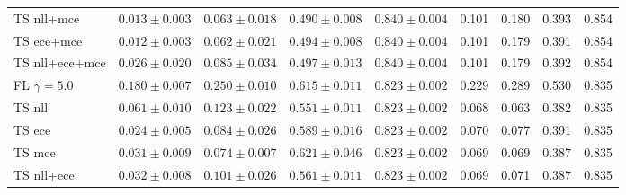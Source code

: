 \begin{table}[h!]
{\begin{tabular}{l|cccc|m{0.8cm}m{0.8cm}m{0.8cm}m{0.8cm}|}
			TS nll+mce & \multicolumn{1}{c|}{$0.013 \pm 0.003$}& \multicolumn{1}{c|}{$0.063 \pm 0.018$}& \multicolumn{1}{c|}{$0.490 \pm 0.008$}& \multicolumn{1}{c|}{$0.840 \pm 0.004$}& \multicolumn{1}{c|}{0.101} & \multicolumn{1}{c|}{0.180} & \multicolumn{1}{c|}{0.393} & \multicolumn{1}{c|}{0.854} \\
			TS ece+mce & \multicolumn{1}{c|}{$0.012 \pm 0.003$}& \multicolumn{1}{c|}{$0.062 \pm 0.021$}& \multicolumn{1}{c|}{$0.494 \pm 0.008$}& \multicolumn{1}{c|}{$0.840 \pm 0.004$}& \multicolumn{1}{c|}{0.101} & \multicolumn{1}{c|}{0.179} & \multicolumn{1}{c|}{0.391} & \multicolumn{1}{c|}{0.854} \\
			TS nll+ece+mce & \multicolumn{1}{c|}{$0.026 \pm 0.020$}& \multicolumn{1}{c|}{$0.085 \pm 0.034$}& \multicolumn{1}{c|}{$0.497 \pm 0.013$}& \multicolumn{1}{c|}{$0.840 \pm 0.004$}& \multicolumn{1}{c|}{0.101} & \multicolumn{1}{c|}{0.179} & \multicolumn{1}{c|}{0.392} & \multicolumn{1}{c|}{0.854} \\ \hline \hline
			FL $\gamma=5.0$ & \multicolumn{1}{c|}{$0.180 \pm 0.007$}& \multicolumn{1}{c|}{$0.250 \pm 0.010$}& \multicolumn{1}{c|}{$0.615 \pm 0.011$}& \multicolumn{1}{c|}{$0.823 \pm 0.002$}& \multicolumn{1}{c|}{0.229} & \multicolumn{1}{c|}{0.289} & \multicolumn{1}{c|}{0.530} & \multicolumn{1}{c|}{0.835} \\
			TS nll & \multicolumn{1}{c|}{$0.061 \pm 0.010$}& \multicolumn{1}{c|}{$0.123 \pm 0.022$}& \multicolumn{1}{c|}{$0.551 \pm 0.011$}& \multicolumn{1}{c|}{$0.823 \pm 0.002$}& \multicolumn{1}{c|}{0.068} & \multicolumn{1}{c|}{0.063} & \multicolumn{1}{c|}{0.382} & \multicolumn{1}{c|}{0.835} \\
			TS ece & \multicolumn{1}{c|}{$0.024 \pm 0.005$}& \multicolumn{1}{c|}{$0.084 \pm 0.026$}& \multicolumn{1}{c|}{$0.589 \pm 0.016$}& \multicolumn{1}{c|}{$0.823 \pm 0.002$}& \multicolumn{1}{c|}{0.070} & \multicolumn{1}{c|}{0.077} & \multicolumn{1}{c|}{0.391} & \multicolumn{1}{c|}{0.835} \\
			TS mce & \multicolumn{1}{c|}{$0.031 \pm 0.009$}& \multicolumn{1}{c|}{$0.074 \pm 0.007$}& \multicolumn{1}{c|}{$0.621 \pm 0.046$}& \multicolumn{1}{c|}{$0.823 \pm 0.002$}& \multicolumn{1}{c|}{0.069} & \multicolumn{1}{c|}{0.069} & \multicolumn{1}{c|}{0.387} & \multicolumn{1}{c|}{0.835} \\
			TS nll+ece & \multicolumn{1}{c|}{$0.032 \pm 0.008$}& \multicolumn{1}{c|}{$0.101 \pm 0.026$}& \multicolumn{1}{c|}{$0.561 \pm 0.011$}& \multicolumn{1}{c|}{$0.823 \pm 0.002$}& \multicolumn{1}{c|}{0.069} & \multicolumn{1}{c|}{0.071} & \multicolumn{1}{c|}{0.387} & \multicolumn{1}{c|}{0.835} \\

\end{tabular}}
\end{table}
